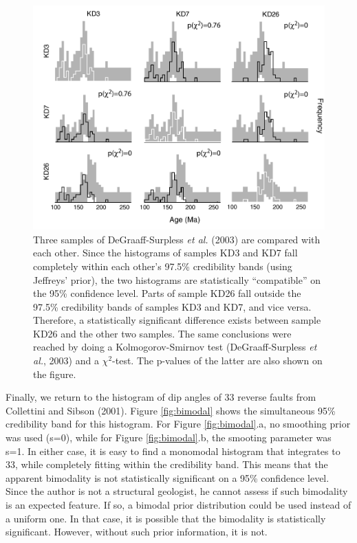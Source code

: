 \documentclass{article}
\begin{document}
\begin{figure}[h]
  \centering
  \includegraphics[width=12cm]{KDcrossplot.pdf}
  \caption{
Three samples  of DeGraaff-Surpless {\it  et al.} (2003)  are compared
with each  other.  Since  the histograms of  samples KD3 and  KD7 fall
completely  within  each   other's  97.5\%  credibility  bands  (using
Jeffreys' prior), the  two histograms are statistically ``compatible''
on the  95\% confidence level. Parts  of sample KD26  fall outside the
97.5\%  credibility bands  of samples  KD3  and KD7,  and vice  versa.
Therefore,  a  statistically  significant  difference  exists  between
sample  KD26 and  the other  two samples.   The same  conclusions were
reached by doing a  Kolmogorov-Smirnov test (DeGraaff-Surpless {\it et
al.}, 2003) and  a $\chi^2$-test. The p-values of  the latter are also
shown on the figure.}
  \label{fig:KDcrossplot}
\end{figure}

Finally, we return to the histogram of dip angles of 33 reverse faults
from Collettini and Sibson (2001).  Figure \ref{fig:bimodal} shows the
simultaneous  95\% credibility  band for  this histogram.   For Figure
\ref{fig:bimodal}.a,  no smoothing  prior  was used  (s=0), while  for
Figure \ref{fig:bimodal}.b, the smooting parameter was s=1.  In either
case, it is easy to find  a monomodal histogram that integrates to 33,
while completely fitting within  the credibility band. This means that
the  apparent bimodality is  not statistically  significant on  a 95\%
confidence level. Since  the author is not a  structural geologist, he
cannot  assess if such  bimodality is  an expected  feature. If  so, a
bimodal prior distribution could be  used instead of a uniform one. In
that  case,  it  is  possible  that the  bimodality  is  statistically
significant.  However, without such prior information, it is not.
\end{document}
